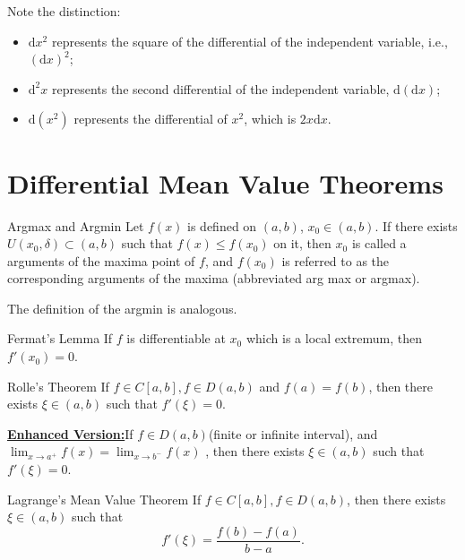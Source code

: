 \documentclass[11pt]{../../TexTemplate/elegantbook}
\begin{document}
\begin{caution}
    Note the distinction: 
    \begin{itemize}
        \item \(\mathrm{d}x^2\) represents the square of the differential of the independent variable, i.e., \((\mathrm{d}x)^2\);
        \item \(\mathrm{d}^2x\) represents the second differential of the independent variable, \(\mathrm{d}(\mathrm{d}x)\);
        \item \(\mathrm{d}(x^2)\) represents the differential of \(x^2\), which is \(2x\mathrm{d}x\).
    \end{itemize}
\end{caution}

\section{Differential Mean Value Theorems}
\begin{definition}{Argmax and Argmin}
    Let \(f(x)\) is defined on \((a,b)\), \(x_{0}\in (a,b)\).
    If there exists \(U(x_{0}, \delta)\subset (a,b)\) such that \(f(x)\leqslant f(x_{0})\) on it,
    then \(x_{0}\) is called a arguments of the maxima point of \(f\),
    and \(f(x_{0})\) is referred to as the corresponding arguments of the maxima (abbreviated arg max or argmax).

    The definition of the argmin is analogous.
\end{definition}


\begin{lemma}{Fermat's Lemma}
    If \(f\) is differentiable at \(x_{0}\) which is a local extremum, then \(f'(x_{0}) = 0\).
\end{lemma}

\begin{theorem}{Rolle's Theorem}
    If \(f\in C[a,b], f\in D(a,b)\) and \(f(a) = f(b)\), then there exists \(\xi\in (a,b)\) such that \(f'(\xi) = 0\).

    \underline{\textbf{Enhanced Version:}}If \(f\in D(a,b)\)(finite or infinite interval), 
    and \(\lim_{x \to a^{+}} f(x) = \lim_{x \to b^{-}} f(x) \) , 
    then there exists \(\xi\in (a,b)\) such that \(f'(\xi) = 0\).
\end{theorem}

\begin{theorem}{Lagrange's Mean Value Theorem}
    If \(f\in C[a,b], f\in D(a,b)\), then there exists \(\xi\in (a,b)\) such that
    \[
        f'(\xi) = \frac{f(b) - f(a)}{b - a}.
    \]
\end{theorem}
\end{document}
